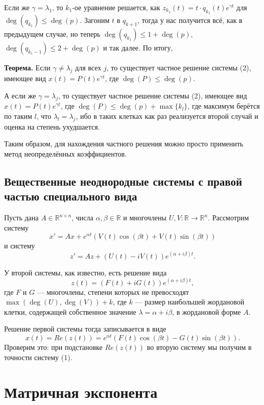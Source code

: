 Если же $\gamma = \lambda_1$, то $k_1$-ое уравнение решается, как $z_{k_1}(t) = t \cdot q_{k_1}(t) e^{\gamma t}$ для $\deg(q_{k_1}) \le \deg(p)$.
Загоним $t$ в $q_{k+1}$, тогда у нас получится всё, как в предыдущем случае, но теперь $\deg(q_{k_1}) \le 1 + \deg(p)$, $\deg(q_{k_1-1}) \le 2 + \deg(p)$ и так далее.
По итогу,

\textbf{Теорема.} Если $\gamma \ne \lambda_j$ для всех $j$, то существует частное решение системы (2), имеющее вид $x(t) = P(t) e^{\gamma t}$, где $\deg(P) \le \deg(p)$.

А если же $\gamma = \lambda_j$, то существует частное решение системы (2), имеющее вид $x(t) = P(t) e^{\gamma t}$, где $\deg(P) \le \deg(p) + \max\{k_l\}$, где максимум берётся по таким $l$, что $\lambda_l = \lambda_j$, ибо в таких клетках как раз реализуется второй случай и оценка на степень ухудшается.

Таким образом, для нахождения частного решения можно просто применить метод неопределённых коэффициентов.

\setcounter{equation}{0}
\subsection{Вещественные неоднородные системы с правой частью специального вида}
Пусть дана $A \in \mathbb R^{n \times n}$, числа $\alpha, \beta \in \mathbb R$ и многочлены $U, V: \mathbb R \to \mathbb R^n$.
Рассмотрим систему
\begin{equation}
    x' = Ax + e^{\alpha t}(V(t) \cos(\beta t) + V(t) \sin(\beta t))
\end{equation}
и систему
\begin{equation}
    z' = Az + (U(t) - i V(t)) e^{(\alpha + i \beta) t}.
\end{equation}

У второй системы, как известно, есть решение вида
\[
    z(t) = (F(t) + i G(t)) e^{(\alpha + i\beta)t},
\]
где $F$ и $G$ --- многочлены, степени которых не превосходят $\max(\deg(U), \deg(V)) + k$, где $k$ --- размер наибольшей жордановой клетки, содержащей собственное значение $\lambda = \alpha + i\beta$, в жордановой форме $A$.

Решение первой системы тогда записывается в виде
\[
    x(t) = Re(z(t)) = e^{\alpha t} (F(t) \cos(\beta t) - G(t) \sin(\beta t)).
\]
Проверим это: при подстановке $Re(z(t))$ во вторую систему мы получим в точности систему (1).

\section{Матричная экспонента}
